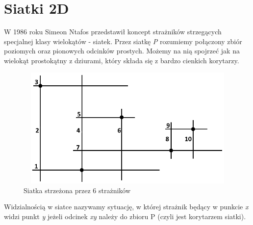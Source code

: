 \documentclass[brudnopis]{xmgr}
\begin{document}
\section{Siatki 2D}
W 1986 roku Simeon Ntafos przedstawił koncept strażników strzegących specjalnej klasy wielokątów - siatek.
Przez siatkę \textit{P} rozumiemy połączony zbiór poziomych oraz pionowych odcinków prostych. Możemy na nią spojrzeć jak na wielokąt prostokątny z dziurami, który składa się z bardzo cienkich korytarzy.
 \begin{figure}[ht!]
   \centering
   \includegraphics[width=14cm,height=6cm]{rysunki/przykladowa_siatka.png}
   \caption{Siatka strzeżona przez 6 strażników}
 \end{figure} 
Widzialnością w siatce nazywamy sytuację, w której strażnik będący w punkcie \textit{x} widzi punkt \textit{y} jeżeli odcinek \textit{xy} należy do zbioru P (czyli jest korytarzem siatki).
\end{document}
